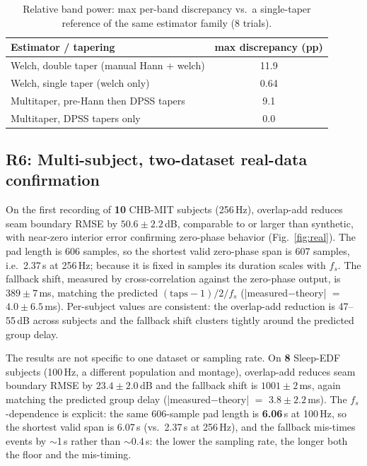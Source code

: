 \documentclass[conference]{IEEEtranSPMB}
\begin{document}
\begin{table}[t]
\caption{Relative band power: max per-band discrepancy vs.\ a single-taper reference of the same
estimator family (8 trials).\label{tab:bp}}
\centering
\begin{tabular}{lc}
\toprule
Estimator / tapering & max discrepancy (pp) \\
\midrule
Welch, double taper (manual Hann + welch)   & 11.9 \\
Welch, single taper (welch only)            & 0.64 \\
Multitaper, pre-Hann then DPSS tapers       & 9.1  \\
Multitaper, DPSS tapers only                & 0.0  \\
\bottomrule
\end{tabular}
\end{table}

\subsection{R6: Multi-subject, two-dataset real-data confirmation}
On the first recording of \textbf{10} CHB-MIT subjects (256\,Hz), overlap-add reduces seam
boundary RMSE by \textbf{$50.6\pm2.2$}\,dB, comparable to or larger than synthetic, with near-zero
interior error confirming zero-phase behavior (Fig.~\ref{fig:real}). The pad length is 606
samples, so the shortest valid zero-phase span is 607 samples, i.e.\ 2.37\,s at 256\,Hz; because
it is fixed in samples its duration scales with $f_s$. The
fallback shift, measured by cross-correlation against the zero-phase output, is
\textbf{$389\pm7$}\,ms, matching the predicted $(\mathrm{taps}-1)/2/f_s$
(|measured$-$theory| $=$ \textbf{$4.0\pm6.5$}\,ms). Per-subject values are consistent: the
overlap-add reduction is 47--55\,dB across subjects and the fallback shift clusters tightly
around the predicted group delay.

The results are not specific to one dataset or sampling rate. On \textbf{8} Sleep-EDF
subjects (100\,Hz, a different population and montage), overlap-add reduces seam boundary RMSE by
\textbf{$23.4\pm2.0$}\,dB and the fallback shift is \textbf{$1001\pm2$}\,ms, again matching the
predicted group delay (|measured$-$theory| $=$ \textbf{$3.8\pm2.2$}\,ms). The $f_s$-dependence is
explicit: the same 606-sample pad length is \textbf{6.06}\,s at 100\,Hz, so the shortest valid
span is 6.07\,s (vs.\ 2.37\,s at 256\,Hz), and the fallback mis-times events by $\sim$1\,s rather
than $\sim$0.4\,s: the lower the sampling rate, the longer both the floor and the mis-timing.
\end{document}
